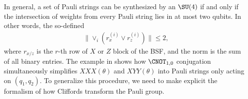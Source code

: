 

In general, a set of Pauli strings can be synthesized by an $\SU(4)$ if and only if the intersection of weights from every Pauli string lies in at most two qubits. In other words, the so-defined \dquote{$\totalWeight$}
\begin{align}
    \lVert  \lor_i (r_x^{(i)}\lor r_z^{(i)})  \rVert \leq 2,
    \label{eq:bsf_simplest}
\end{align}
where $r_{x/z}$ is the $r$-th row of $X$ or $Z$ block of the BSF, and the norm is the sum of all binary entries. The example in  shows how $\CNOT_{1,0}$ conjugation simultaneously simplifies $XXX(\theta)$ and $XYY(\theta)$ into Pauli strings only acting on $(q_1, q_2)$. To generalize this procedure, we need to make explicit the formalism of how Cliffords transform the Pauli group.

